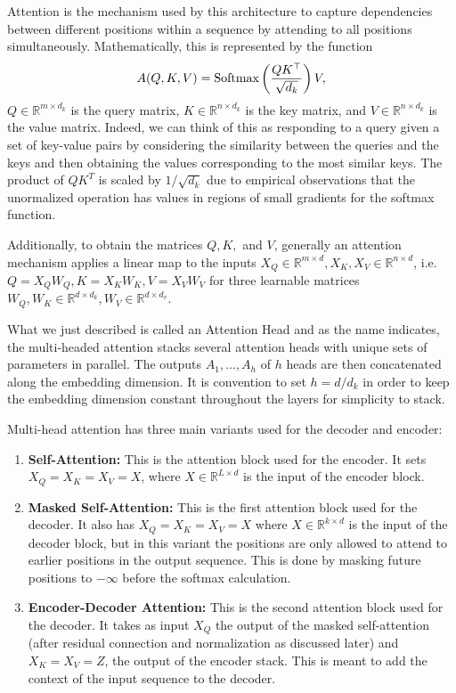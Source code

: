 Attention is the mechanism used by this architecture to capture dependencies between different positions within a sequence by attending to all positions simultaneously. Mathematically, this is represented by the function 
\begin{equation}
    A(Q, K, V) = \text{Softmax}\left(\frac{QK^\top}{\sqrt{d_k}}\right) V,
\end{equation}
$Q \in \mathbb{R}^{m \times d_k}$ is the query matrix, $K \in \mathbb{R}^{n\times d_k}$ is the key matrix, and $V \in \mathbb{R}^{n \times d_k}$ is the value matrix. Indeed, we can think of this 
as responding to a query given a set of key-value pairs by considering the similarity between the queries and the keys and then obtaining the values corresponding to the most similar keys. The product of $QK^T$ is scaled by $1/\sqrt{d_k}$ due to empirical observations that the unormalized operation has values in regions of small gradients for the softmax function.

Additionally, to obtain the matrices $Q, K,$ and $V$, generally an attention mechanism applies a linear map to the inputs $X_Q \in \mathbb{R}^{m \times d}, X_K, X_V \in \mathbb{R}^{n \times d}$, i.e. $Q = X_QW_Q, K=X_KW_K, V=X_VW_V$ for  three learnable matrices $W_Q, W_K \in \mathbb{R}^{d \times d_k}, W_V \in \mathbb{R}^{d \times d_v} $.


What we just described is called an Attention Head and as the name indicates, the multi-headed attention stacks several attention heads with unique sets of parameters in parallel. The outputs $A_1, \ldots, A_h$ of $h$ heads are then concatenated along the embedding dimension. It is convention to set $h = d / d_k$ in order to keep the embedding dimension constant throughout the layers for simplicity to stack.

Multi-head attention has three main variants used for the decoder and encoder:
\begin{enumerate}
    \item \textbf{Self-Attention:} This is the attention block used for the encoder. It sets $X_Q = X_K = X_V = X$, where $X \in \mathbb{R}^{L \times d}$ is the input of the encoder block.
    \item \textbf{Masked Self-Attention:} This is the first attention block used for the decoder. It also has $X_Q = X_K = X_V = X$ where $X \in \mathbb{R}^{k \times d}$ is the input of the decoder block, but in this variant the positions are only allowed to attend to earlier positions in the output sequence. This is done by masking future positions to $-\infty$ before the softmax calculation.
    \item \textbf{Encoder-Decoder Attention:} This is the second attention block used for the decoder. It takes as input $X_Q$ the output of the masked self-attention (after residual connection and normalization as discussed later) and $X_K = X_V = Z$, the output of the encoder stack. This is meant to add the context of the input sequence to the decoder.
\end{enumerate}


